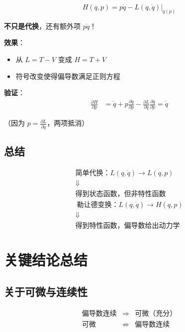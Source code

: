 \documentclass[12pt,a4paper]{article}
\begin{document}
\begin{equation}
H(q, p) = p\dot{q} - L(q, \dot{q})|_{\dot{q}(p)}
\end{equation}

\textbf{不只是代换}，还有额外项 $p\dot{q}$！

\textbf{效果}：
\begin{itemize}
\item 从 $L = T - V$ 变成 $H = T + V$
\item 符号改变使得偏导数满足正则方程
\end{itemize}

\textbf{验证}：
\begin{align}
\frac{\partial H}{\partial p} &= \dot{q} + p\frac{\partial \dot{q}}{\partial p} - \frac{\partial L}{\partial \dot{q}}\frac{\partial \dot{q}}{\partial p} = \dot{q}
\end{align}

（因为 $p = \frac{\partial L}{\partial \dot{q}}$，两项抵消）

\subsection{总结}

\begin{summary}
\begin{equation}
\boxed{
\begin{array}{c}
\text{简单代换：} L(q,\dot{q}) \to L(q,p) \\
\Downarrow \\
\text{得到状态函数，但非特性函数} \\
\
\text{勒让德变换：} L(q,\dot{q}) \to H(q,p) \\
\Downarrow \\
\text{得到特性函数，偏导数给出动力学}
\end{array}
}
\end{equation}
\end{summary}

\section{关键结论总结}

\subsection{关于可微与连续性}

\begin{equation}
\boxed{
\begin{array}{rcl}
\text{偏导数连续} &\Rightarrow& \text{可微（充分）} \\
\text{可微} &\not\Rightarrow& \text{偏导数连续}
\end{array}
}
\end{equation}
\end{document}
